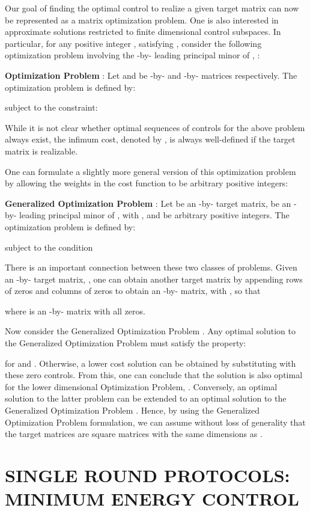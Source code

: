\documentclass[12pt,onecolumn,draftcls]{IEEEtran}
\begin{document}
Our goal of finding the optimal control to realize a given target matrix can now
be represented as a matrix optimization problem.   One is also interested in
approximate solutions restricted to finite dimensional control subspaces.
In particular, for any positive integer , satisfying ,
consider the following optimization problem involving the
-by- leading principal minor of  , :

\noindent \textbf{Optimization Problem} :
Let  and  be -by- and -by- matrices respectively.
The optimization problem is defined by:

subject to the constraint:


While it is not clear whether optimal sequences of controls for the above problem always exist, the infimum cost, denoted by , is always well-defined if the target matrix is realizable.

One can formulate a slightly more general version of this optimization problem by allowing the
weights in the cost function to be arbitrary positive integers:

\noindent \textbf{Generalized Optimization Problem} :
Let  be an -by- target matrix,
 be an -by- leading principal minor of  , with  ,
 and  be arbitrary positive integers.  The optimization problem is defined by:

subject to the condition


There is an important connection between these two classes of problems.
Given an -by- target matrix, , one can obtain another target matrix by
appending rows of zeros and columns of zeros to obtain an -by- matrix, with , so that

where  is an -by- matrix with all zeros.

Now consider the Generalized Optimization Problem .
Any optimal solution to the Generalized Optimization Problem must satisfy the property:

for  and .  Otherwise, a lower cost solution can be obtained by substituting with these
zero controls.   From this, one can conclude that the solution is also optimal for the lower
dimensional Optimization Problem, .
Conversely, an optimal solution to the latter problem can be extended to an optimal solution to
the Generalized Optimization Problem .
Hence, by using the Generalized Optimization Problem formulation, we can assume without loss
of generality that the target matrices are square matrices with the same dimensions as .

\section{SINGLE ROUND PROTOCOLS: MINIMUM ENERGY CONTROL}\setcounter{equation}{0}
\end{document}

